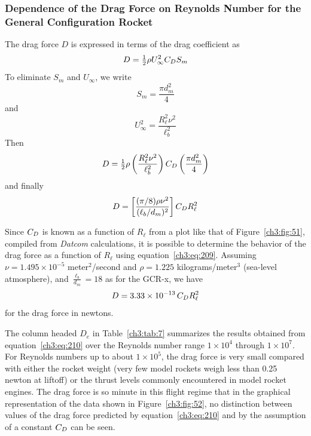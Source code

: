 \subsubsection{Dependence of the Drag Force on Reynolds Number for the General Configuration
Rocket}\label{ch3:sec:6.3.3}

The drag force $D$ is expressed in terms of the drag coefficient as
\begin{equation}\label{ch3:eq:208}
D = \tfrac{1}{2}\rho U_\infty^2C_{D} S_m
\end{equation}
To eliminate $S_m$ and $U_\infty$, we write
\begin{equation*}
S_m = \frac{\pi d_m^2}{4}
\end{equation*}
and
\begin{equation*}
U_\infty^2 = \frac{R_\ell^2\nu^2}{\ell_b^2}
\end{equation*}
Then
\begin{equation*}
D = \tfrac{1}{2}\rho\left(\frac{R_\ell^2\nu^2}{\ell_b^2}\right)C_{D}\left(\frac{\pi d_m^2}{4}\right)
\end{equation*}
and finally
\begin{equation}\label{ch3:eq:209}
D = \left[\frac{(\pi/8)\rho\nu^2}{(\ell_b/d_m)^2}\right]C_{D} R_\ell^2
\end{equation}

Since $C_{D}$ is known as a function of $R_\ell$ from a plot like that of Figure~\ref{ch3:fig:51},
compiled from \emph{Datcom} calculations, it is possible to determine the behavior of the drag
force as a function of $R_\ell$ using equation~\eqref{ch3:eq:209}. Assuming
$\nu = 1.495 \times 10^{-5}$ meter$^{2}$/second and $\rho = 1.225$ kilograms/meter$^{3}$
(sea-level atmosphere), and $\frac{\ell_b}{d_m} = 18$ as for the GCR-x, we have
\begin{equation}\label{ch3:eq:210}
D = 3.33 \times 10^{-13}\,C_{D} R_\ell^2
\end{equation}
for the drag force in newtons.

The column headed $D_e$ in Table~\ref{ch3:tab:7} summarizes the results obtained from
equation~\eqref{ch3:eq:210} over the Reynolds number range $1 \times 10^{4}$ through
$1 \times 10^{7}$. For Reynolds numbers up to about $1 \times 10^{5}$, the drag force is very small
compared with either the rocket weight (very few model rockets weigh less than 0.25 newton at
liftoff) or the thrust levels commonly encountered in model rocket engines. The drag force is so
minute in this flight regime that in the graphical representation of the data shown in
Figure~\ref{ch3:fig:52}, no distinction between values of the drag force predicted by
equation~\eqref{ch3:eq:210} and by the assumption of a constant $C_{D}$ can be seen.

